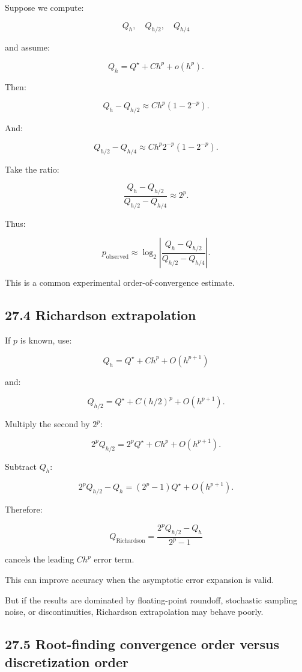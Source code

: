 Suppose we compute:

\[ Q_h,\quad Q_{h/2},\quad Q_{h/4} \]

and assume:

\[ Q_h=Q^\star+Ch^p+o(h^p). \]

Then:

\[ Q_h-Q_{h/2} \approx Ch^p(1-2^{-p}). \]

And:

\[ Q_{h/2}-Q_{h/4} \approx Ch^p2^{-p}(1-2^{-p}). \]

Take the ratio:

\[ \frac{Q_h-Q_{h/2}} {Q_{h/2}-Q_{h/4}} \approx 2^p. \]

Thus:

\[ \boxed{ p_{\mathrm{observed}} \approx \log_2\left| \frac{Q_h-Q_{h/2}} {Q_{h/2}-Q_{h/4}} \right| }. \]

This is a common experimental order-of-convergence estimate.

\subsection{27.4 Richardson extrapolation}\label{02-foundations-ii-ch029-richardson-extrapolation}

\hypertarget{02-foundations-ii-ch029-richardson-extrapolation}{}

If \(p\) is known, use:

\[ Q_h=Q^\star+Ch^p+O(h^{p+1}) \]

and:

\[ Q_{h/2}=Q^\star+C(h/2)^p+O(h^{p+1}). \]

Multiply the second by \(2^p\):

\[ 2^pQ_{h/2} = 2^pQ^\star+Ch^p+O(h^{p+1}). \]

Subtract \(Q_h\):

\[ 2^pQ_{h/2}-Q_h = (2^p-1)Q^\star+O(h^{p+1}). \]

Therefore:

\[ \boxed{ Q_{\mathrm{Richardson}} = \frac{2^pQ_{h/2}-Q_h}{2^p-1} } \]

cancels the leading \(Ch^p\) error term.

This can improve accuracy when the asymptotic error expansion is valid.

But if the results are dominated by floating-point roundoff, stochastic sampling noise, or discontinuities, Richardson extrapolation may behave poorly.

\subsection{27.5 Root-finding convergence order versus discretization order}\label{02-foundations-ii-ch029-root-finding-convergence-order-versus-discretization-order}

